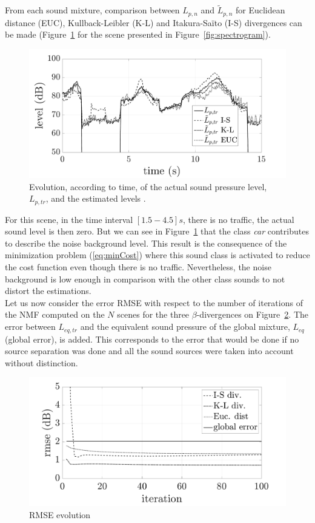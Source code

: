 \documentclass{article}
\begin{document}
\begin{sloppy}
From each sound mixture, comparison between $L_{p,n}$ and $\tilde{L}_{p,n}$ for Euclidean distance (EUC), Kullback-Leibler (K-L) and Itakura-Saïto (I-S) divergences can be made (Figure~\ref{fig:Lp} for the scene presented in Figure~\ref{fig:spectrogram}).\\

\begin{figure}[t]
\centering
\centerline{\includegraphics[width=.5\textwidth]{images/Lp_bvak_Sc2_It100_nbCl3.pdf}}
\caption{Evolution, according to time, of the actual sound pressure level, $L_{p,tr}$, and the estimated levels .}
\label{fig:Lp}
\end{figure}

For this scene, in the time interval $\left[ 1.5 - 4.5\right] s$, there is no traffic, the actual sound level is then zero. But we can see in Figure~\ref{fig:Lp} that the class \textit{car} contributes to describe the noise background level. This result is the consequence of the minimization problem (\ref{eq:minCost}) where this sound class is activated to reduce the cost function even though there is no traffic. Nevertheless, the noise background is low enough in comparison with the other class sounds to not distort the estimations.\\

Let us now consider the error RMSE with respect to the number of iterations of the NMF computed on the $N$ scenes for the three $\beta$-divergences on Figure~\ref{fig:rmse}. The error between $L_{eq,tr}$ and the equivalent sound pressure of the global mixture, $L_{eq}$ (global error), is added. This corresponds to the error that would be done if no source separation was done and all the sound sources were taken into account without distinction.

\begin{figure}[t]
\centering
\includegraphics[width=.5\textwidth]{images/comparaison_RMSE_nbCl3.pdf}
\caption{RMSE evolution}
\label{fig:rmse}
\end{figure}


\end{sloppy}
\end{document}
